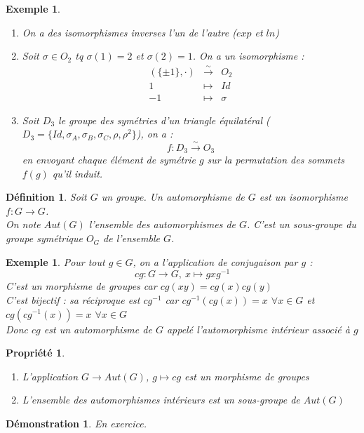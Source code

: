 \documentclass[a4paper, oneside]{report}
\theoremstyle{break}
\newtheorem{defi}[thm]{Définition}
\newtheorem{propr}[thm]{Propriété}
\newtheorem{exem}[thm]{Exemple}
\newtheorem*{demo}{Démonstration}
\newcommand{\mdg}{morphisme de groupes }
\newcommand{\auts}{automorphismes }
\newcommand{\fong}{\overset{\sim}{\rightarrow}}
\begin{document}
\begin{exem}
	\begin{enumerate}
		\item On a des isomorphismes inverses l'un de l'autre ($exp$ et $ln$)
		\item Soit $\sigma \in O_2$ tq $\sigma(1)=2$ et $\sigma(2)=1$. On a un isomorphisme :
		$$\begin{array}{lll}
		(\{\pm 1\}, \cdot)&\fong & O_2\\
		1&\mapsto &Id\\
		-1&\mapsto&\sigma
		\end{array}$$
		
		\item Soit $D_3$ le groupe des symétries d'un triangle équilatéral ($D_3=\{Id, \sigma_A, \sigma_B, \sigma_C, \rho, \rho^2\}$), on a : 
		$$f:D_3 \fong O_3$$
		en envoyant chaque élément de symétrie $g$ sur la permutation des sommets $f(g)$ qu'il induit.
	\end{enumerate}
\end{exem}

\begin{defi}
	Soit $G$ un groupe. Un automorphisme de $G$ est un isomorphisme $f:G\rightarrow G$.\\
	On note $Aut(G)$ l'ensemble des automorphismes de $G$. C'est un sous-groupe du groupe symétrique $O_G$ de l'ensemble $G$.
\end{defi}

\begin{exem}
	Pour tout $g\in G$, on a l'application de conjugaison par $g$ :
	$$cg : G \rightarrow G,~x\mapsto gxg^{-1}$$
	C'est un \mdg  car $cg(xy)=cg(x)cg(y)$\\
	C'est bijectif : sa réciproque est $cg^{-1}$ car $cg^{-1}(cg(x))=x$ $\forall x\in G$ et $cg(cg^{-1}(x)) = x$ $ \forall x\in G$\\
	Donc $cg$ est un automorphisme de $G$ appelé l'automorphisme intérieur associé à $g$
\end{exem}

\begin{propr}
	\begin{enumerate}
		\item L'application $G\rightarrow Aut(G)$, $g\mapsto cg$ est un \mdg
		\item L'ensemble des \auts intérieurs est un sous-groupe de $Aut(G)$
	\end{enumerate}
\end{propr}

\begin{demo}
	En exercice.
\end{demo}
\end{document}
